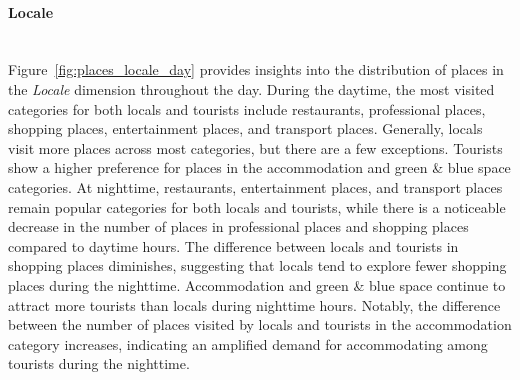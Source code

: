 \documentclass{article}
\newcommand{\subsubsubsection}[1]{\paragraph{#1}\mbox{}\\}
\theoremstyle{definition}
\theoremstyle{remark}
\begin{document}
\subsubsubsection{Locale}
Figure~\ref{fig:places_locale_day} provides insights into the distribution of places in the \textit{Locale} dimension throughout the day. During the daytime, the most visited categories for both locals and tourists include restaurants, professional places, shopping places, entertainment places, and transport places. Generally, locals visit more places across most categories, but there are a few exceptions. Tourists show a higher preference for places in the accommodation and green \& blue space categories. At nighttime, restaurants, entertainment places, and transport places remain popular categories for both locals and tourists, while there is a noticeable decrease in the number of places in professional places and shopping places compared to daytime hours. The difference between locals and tourists in shopping places diminishes, suggesting that locals tend to explore fewer shopping places during the nighttime. Accommodation and green \& blue space continue to attract more tourists than locals during nighttime hours. Notably, the difference between the number of places visited by locals and tourists in the accommodation category increases, indicating an amplified demand for accommodating among tourists during the nighttime.
\end{document}
